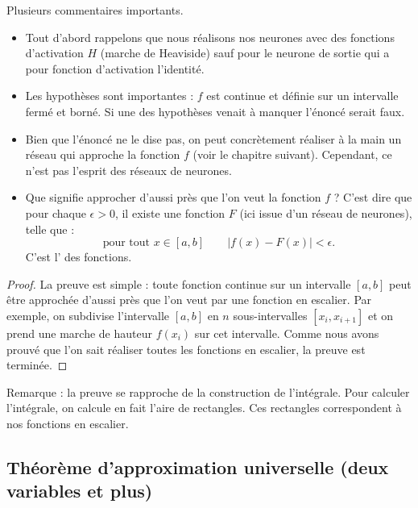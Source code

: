 Plusieurs commentaires importants.
\begin{itemize}
	\item Tout d'abord rappelons que nous réalisons nos neurones avec des fonctions d'activation $H$ (marche de Heaviside) sauf pour le neurone de sortie qui a pour fonction d'activation l'identité.
	
	\item Les hypothèses sont importantes : $f$ est continue et définie sur un intervalle fermé et borné. Si une des hypothèses venait à manquer l'énoncé serait faux.
	
	\item Bien que l'énoncé ne le dise pas, on peut concrètement réaliser à la main un réseau qui approche la fonction $f$ (voir le chapitre suivant). Cependant, ce n'est pas l'esprit des réseaux de neurones.
	
	\item Que signifie \og{}approcher d'aussi près que l'on veut la fonction $f$\fg{} ? C'est dire que pour chaque $\epsilon>0$, il existe une fonction $F$ (ici issue d'un réseau de neurones), telle que :
	$$\text{pour tout } x \in [a,b] \qquad | f(x)-F(x) | < \epsilon.$$
	C'est l'  des fonctions.
	
\end{itemize}


\begin{proof}  
	La preuve est simple : toute fonction continue sur un intervalle $[a,b]$ peut être approchée d'aussi près que l'on veut par une fonction en escalier. Par exemple, on subdivise l'intervalle $[a,b]$ en $n$ sous-intervalles $[x_i,x_{i+1}]$ et on prend une marche de hauteur $f(x_i)$ sur cet intervalle. Comme nous avons prouvé que l'on sait réaliser toutes les fonctions en escalier, la preuve est terminée.
	
	
	
\end{proof}

Remarque : la preuve se rapproche de la construction de l'intégrale. Pour calculer l'intégrale, on calcule en fait l'aire de rectangles. Ces rectangles correspondent à nos fonctions en escalier. 


\subsection{Théorème d'approximation universelle (deux variables et plus)}

